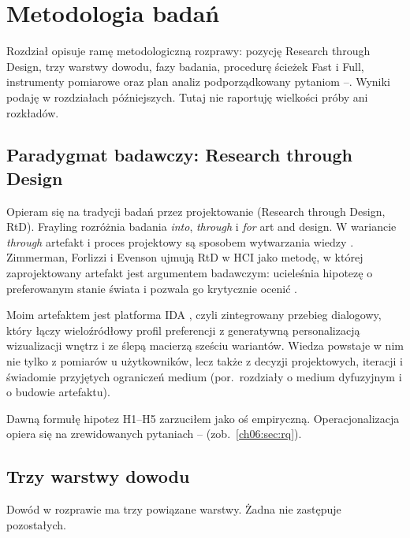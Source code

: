 \chapter{Metodologia badań}
\label{ch06:top}

Rozdział opisuje ramę metodologiczną rozprawy: pozycję Research through Design, trzy warstwy dowodu, fazy badania, procedurę ścieżek Fast i Full, instrumenty pomiarowe oraz plan analiz podporządkowany pytaniom --. Wyniki podaję w rozdziałach późniejszych. Tutaj nie raportuję wielkości próby ani rozkładów.

\section{Paradygmat badawczy: Research through Design}
\label{ch06:sec:paradygmat}

Opieram się na tradycji badań przez projektowanie (Research through Design, RtD). Frayling rozróżnia badania \emph{into}, \emph{through} i \emph{for} art and design. W wariancie \emph{through} artefakt i proces projektowy są sposobem wytwarzania wiedzy \parencite{frayling1993research}. Zimmerman, Forlizzi i Evenson ujmują RtD w HCI jako metodę, w której zaprojektowany artefakt jest argumentem badawczym: ucieleśnia hipotezę o preferowanym stanie świata i pozwala go krytycznie ocenić \parencite{zimmerman2007rtd}.

Moim artefaktem jest platforma IDA \parencite{idaPlatform2026}, czyli zintegrowany przebieg dialogowy, który łączy wieloźródłowy profil preferencji z generatywną personalizacją wizualizacji wnętrz i ze ślepą macierzą sześciu wariantów. Wiedza powstaje w nim nie tylko z pomiarów u użytkowników, lecz także z decyzji projektowych, iteracji i świadomie przyjętych ograniczeń medium (por.\ rozdziały o medium dyfuzyjnym i o budowie artefaktu).

Dawną formułę hipotez H1--H5 zarzuciłem jako oś empiryczną. Operacjonalizacja opiera się na zrewidowanych pytaniach -- (zob.\ \cref{ch06:sec:rq}).

\section{Trzy warstwy dowodu}
\label{ch06:sec:warstwy}

Dowód w rozprawie ma trzy powiązane warstwy. Żadna nie zastępuje pozostałych.

